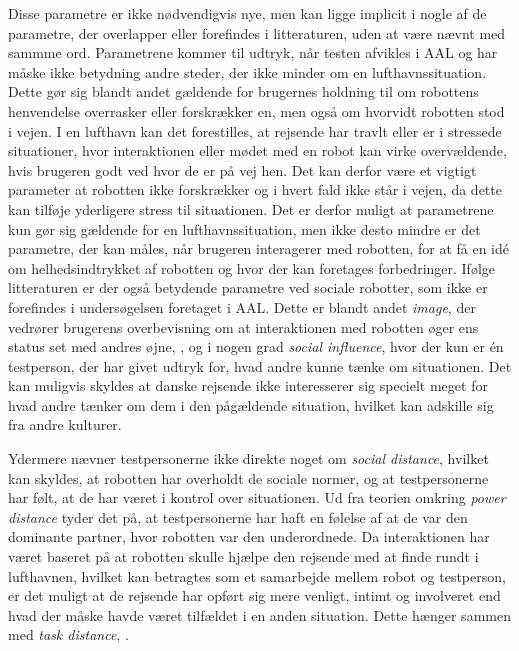 \noindent
%
Disse parametre er ikke nødvendigvis nye, men kan ligge implicit i nogle af de parametre, der overlapper eller forefindes i litteraturen, uden at være nævnt med sammme ord. Parametrene kommer til udtryk, når testen afvikles i AAL og har måske ikke betydning andre steder, der ikke minder om en lufthavnssituation. Dette gør sig blandt andet gældende for brugernes holdning til om robottens henvendelse overrasker eller forskrækker en, men også om hvorvidt robotten stod i vejen. I en lufthavn kan det forestilles, at rejsende har travlt eller er i stressede situationer, hvor interaktionen eller mødet med en robot kan virke overvældende, hvis brugeren godt ved hvor de er på vej hen. Det kan derfor være et vigtigt parameter at robotten ikke forskrækker og i hvert fald ikke står i vejen, da dette kan tilføje yderligere stress til situationen. Det er derfor muligt at parametrene kun gør sig gældende for en lufthavnssituation, men ikke desto mindre er det parametre, der kan måles, når brugeren interagerer med robotten, for at få en idé om helhedsindtrykket af robotten og hvor der kan foretages forbedringer. \blankline
%
Ifølge litteraturen er der også betydende parametre ved sociale robotter, som ikke er forefindes i undersøgelsen foretaget i AAL. Dette er blandt andet \textit{image}, der vedrører brugerens overbevisning om at interaktionen med robotten øger ens status set med andres øjne, \parencite[s. 1478]{PDF:ExploringInfluencingVariable}, og i nogen grad \textit{social influence}, hvor der kun er én testperson, der har givet udtryk for, hvad andre kunne tænke om situationen. Det kan muligvis skyldes at danske rejsende ikke interesserer sig specielt meget for hvad andre tænker om dem i den pågældende situation, hvilket kan adskille sig fra andre kulturer. 

Ydermere nævner testpersonerne ikke direkte noget om \textit{social distance}, hvilket kan skyldes, at robotten har overholdt de sociale normer, og at testpersonerne har følt, at de har været i kontrol over situationen. Ud fra teorien omkring \textit{power distance} tyder det på, at testpersonerne har haft en følelse af at de var den dominante partner, hvor robotten var den underordnede. Da interaktionen har været baseret på at robotten skulle hjælpe den rejsende med at finde rundt i lufthavnen, hvilket kan betragtes som et samarbejde mellem robot og testperson, er det muligt at de rejsende har opført sig mere venligt, intimt og involveret end hvad der måske havde været tilfældet i en anden situation. Dette hænger sammen med \textit{task distance}, \parencite[s. 784]{PDF:HowSocialDistanceShapesHRI}. 

